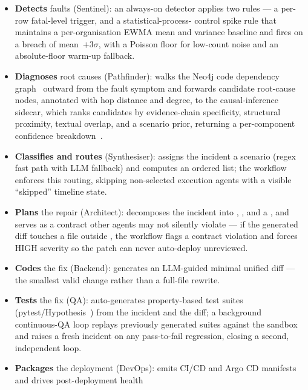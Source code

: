 \begin{itemize}[nosep]
  \item \textbf{Detects} faults (Sentinel): an always-on detector applies two
        rules --- a per-row fatal-level trigger, and a statistical-process-%
        control spike rule that maintains a per-organisation EWMA mean and
        variance baseline and fires on a breach of mean~$+3\sigma$, with a
        Poisson floor for low-count noise and an absolute-floor warm-up
        fallback.
  \item \textbf{Diagnoses} root causes (Pathfinder): walks the Neo4j code
        dependency graph~\cite{neo4j} outward from the fault symptom and
        forwards candidate root-cause nodes, annotated with hop distance and
        degree, to the causal-inference sidecar, which ranks candidates by
        evidence-chain specificity, structural proximity, textual overlap,
        and a scenario prior, returning a per-component confidence
        breakdown~\cite{dowhy}.
  \item \textbf{Classifies and routes} (Synthesiser): assigns the incident a
        scenario (regex fast path with LLM fallback) and computes an ordered
         list; the workflow enforces this routing,
        skipping non-selected execution agents with a visible ``skipped''
        timeline state.
  \item \textbf{Plans} the repair (Architect): decomposes the incident into
        , , and a
        , and serves as a contract other agents may not
        silently violate --- if the generated diff touches a file outside
        , the workflow flags a contract violation and
        forces HIGH severity so the patch can never auto-deploy unreviewed.
  \item \textbf{Codes} the fix (Backend): generates an LLM-guided minimal
        unified diff --- the smallest valid change rather than a full-file
        rewrite.
  \item \textbf{Tests} the fix (QA): auto-generates property-based test
        suites (pytest/Hypothesis~\cite{hypothesis}) from the incident and
        the diff; a background continuous-QA loop replays previously
        generated suites against the sandbox and raises a fresh incident on
        any pass-to-fail regression, closing a second, independent loop.
  \item \textbf{Packages} the deployment (DevOps): emits CI/CD and Argo CD
        manifests~\cite{argocd} and drives post-deployment health

\end{itemize}
